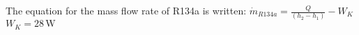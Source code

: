 The equation for the mass flow rate of R134a is written:  
\( \dot{m}_{R134a} = \frac{Q}{(h_2 - h_1)} - W_K \)  
\( W_K = 28 \, \text{W} \)